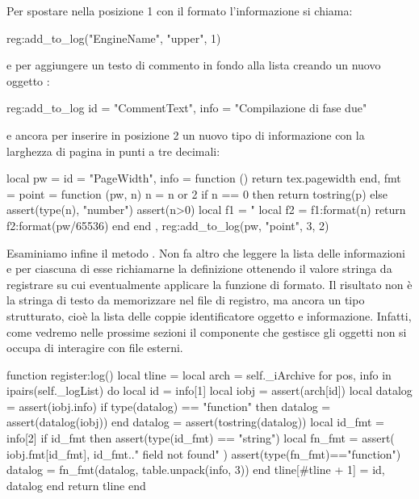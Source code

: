 Per spostare nella posizione 1 con il formato  l'informazione
 si chiama:
\begin{lines}
reg:add_to_log({"EngineName", "upper"}, 1)
\end{lines}
e per aggiungere un testo di commento in fondo alla lista creando un nuovo
oggetto :
\begin{lines}
reg:add_to_log{
    id = "CommentText",
    info = "Compilazione di fase due"
}
\end{lines}
e ancora per inserire in posizione 2 un nuovo tipo di informazione con la
larghezza di pagina in punti a tre decimali:
\begin{lines}
local pw = {
    id = "PageWidth",
    info = function () return tex.pagewidth end,
    fmt = {
        point = function (pw, n)
            n = n or 2
            if n == 0 then
                return tostring(p)
            else
                assert(type(n), "number")
                assert(n>0)
                local f1 = "%
                local f2 = f1:format(n)
                return f2:format(pw/65536) 
            end
        end
    },
}
reg:add_to_log({pw, "point", 3}, 2)
\end{lines}

Esaminiamo infine il metodo . Non fa altro che leggere la lista delle
informazioni e per ciascuna di esse richiamarne la definizione ottenendo il
valore stringa da registrare su cui eventualmente applicare la funzione di
formato. Il risultato non è la stringa di testo da memorizzare nel file di
registro, ma ancora un tipo strutturato, cioè la lista delle coppie
identificatore oggetto e informazione. Infatti, come vedremo nelle prossime
sezioni il componente che gestisce gli oggetti  non si occupa di
interagire con file esterni.
\begin{lines}
function register:log()
    local tline = {}
    local arch = self._iArchive
    for pos, info in ipairs(self._logList) do
        local id = info[1]
        local iobj = assert(arch[id])
        local datalog = assert(iobj.info)
        if type(datalog) == "function" then
            datalog = assert(datalog(iobj))
        end
        datalog = assert(tostring(datalog))
        local id_fmt = info[2]
        if id_fmt then
            assert(type(id_fmt) == "string")
            local fn_fmt = assert(
                iobj.fmt[id_fmt], id_fmt.." field not found"
            )
            assert(type(fn_fmt)=="function")
            datalog = fn_fmt(datalog, table.unpack(info, 3))
        end
        tline[#tline + 1] = {id, datalog}
    end
    return tline
end
\end{lines}

